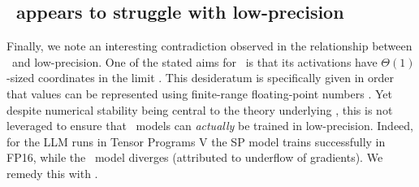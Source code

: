 \subsection{\mup\ appears to struggle with low-precision}

Finally, we note an interesting contradiction observed in the relationship between \mup\ and low-precision. One of the stated aims for \mup\ is that its activations have $\Theta(1)$-sized coordinates in the limit \citep[Desiderata J.1]{Tensor_Programs_V}. This desideratum is specifically given in order that values can be represented using finite-range floating-point numbers \citep[Section 3]{Tensor_Programs_IV}.
Yet despite numerical stability being central to the theory underlying \mup, this is not leveraged to ensure that \mup\ models can \textit{actually} be trained in low-precision. Indeed, for the LLM runs in Tensor Programs V the SP model trains successfully in FP16, while the \mup\ model diverges (attributed to underflow of gradients). We remedy this with \umup.
